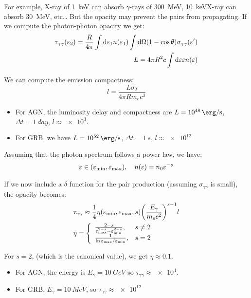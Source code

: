 \documentclass[10pt,a4paper,english]{article}
\let\originalleft\left
\let\originalright\right
\renewcommand{\left}{\mathopen{}\mathclose\bgroup\originalleft}
\renewcommand{\right}{\aftergroup\egroup\originalright}
\begin{document}
For example, X-ray of \SI{1}{keV} can absorb $\gamma$-rays of \SI{300}{MeV},
\SI{10}{keV}X-ray can absorb \SI{30}{MeV}, etc… But the opacity may prevent the
pairs from propagating. If we compute the photon-photon opacity we get:
\begin{align}
    \tau_{\gamma\gamma} (\varepsilon_2) = \frac{R}{4\pi}\int\mathrm{d}\varepsilon_1 n(\varepsilon_1) \int\mathrm{d}\Omega (1 - \cos\theta) \sigma_{\gamma\gamma} (\varepsilon') \\
    L = 4\pi R^2 c\int\mathrm{d}\varepsilon \varepsilon n(\varepsilon)
\end{align}

We can compute the emission compactness:
\begin{equation}
    l = \frac{L\sigma_T}{4\pi Rm_ec^3}
\end{equation}
\begin{itemize}
    \item For AGN, the luminosity delay and compactness are $L =
          \SI{e48}{\erg\per\s}$, $\Delta t = \SI{1}{day}$, $l\approx \num{e3}$.
    \item For GRB, we have $L=\SI{e52}{\erg\per\s}$, $\Delta t = \SI{1}{s}$, $l
          \approx \num{e12}$
\end{itemize}

Assuming that the photon spectrum follows a power law, we have:
\begin{equation}
    \varepsilon \in \left( \varepsilon_\mathrm{min}, \varepsilon_\mathrm{max} \right),\quad n(\varepsilon) = n_0 \varepsilon^{-s}
\end{equation}

If we now include a $\delta$ function for the pair production (assuming
$\sigma_{\gamma\gamma}$ is small), the opacity becomes:
\begin{align}
    & \tau_{\gamma\gamma} \approx \frac{1}{4}\eta \left( \varepsilon_\mathrm{min}, \varepsilon_\mathrm{max}, s \right) \left( \frac{E_\gamma}{m_ec^2} \right)^{s-1} l \\
    & \eta = \left\lbrace
    \begin{array}{lr}
        \frac{2-s}{\varepsilon_\mathrm{max}^{2-s} - \varepsilon_\mathrm{min}^{2-s}}, & s\neq 2 \\
        \frac{1}{\ln\varepsilon_\mathrm{max}/\varepsilon_\mathrm{min}}, & s = 2
    \end{array}\right.
\end{align}

For $s=2$, (which is the canonical value), we get $\eta \approx 0.1$.
\begin{itemize}
    \item For AGN, the energy is $E_\gamma = \SI{10}{GeV}$ so
          $\tau_{\gamma\gamma} \approx \num{e4}$.
    \item For GRB, $E_\gamma = \SI{10}{MeV}$, so $\tau_{\gamma\gamma} \approx
          \num{e12}$
\end{itemize}
\end{document}
